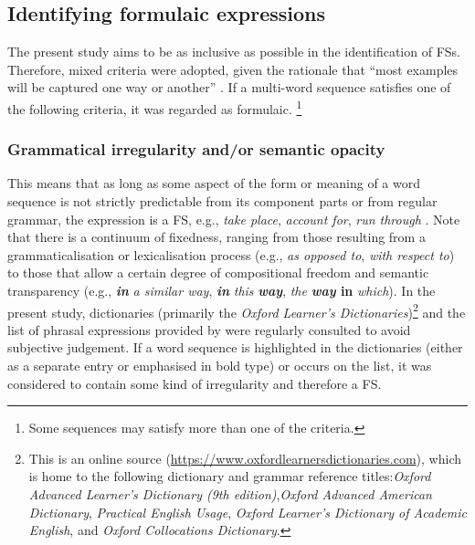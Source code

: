 \documentclass[output=paper]{langscibook}
\begin{document}
\subsection{Identifying formulaic expressions}\label{sec:wang:2.2}

The present study aims to be as inclusive as possible in the identification of FSs. Therefore, mixed criteria were adopted, given the rationale that “most examples will be captured one way or another” \citep[110]{Wray2008}. If a multi-word sequence satisfies one of the following criteria, it was regarded as formulaic. \footnote{{Some sequences may satisfy more than one of the criteria.}}

\subsubsection{Grammatical irregularity and/or semantic opacity}

This means that as long as some aspect of the form or meaning of a word sequence is not strictly predictable from its component parts or from regular grammar, the expression is a FS, e.g., \textit{take place}, \textit{account for}, \textit{run through} \citep{Wray2008,SchneiderEtAl2014,Herbst2015}. Note that there is a continuum of fixedness, ranging from those resulting from a grammaticalisation or lexicalisation process (e.g., \textit{as opposed to}, \textit{with respect to}) to those that allow a certain degree of compositional freedom and semantic transparency (e.g., \textbf{\textit{in}} \textit{a similar way}, \textbf{\textit{in}} \textit{this} \textbf{\textit{way}}, \textit{the} \textbf{\textit{way} \textbf{in}} \textit{which}). In the present study, dictionaries (primarily the \textit{Oxford Learner's Dictionaries})\footnote{{This is an online source (}\url{https://www.oxfordlearnersdictionaries.com}\textrm{), which is home to the following dictionary and grammar reference titles:}{\textit{Oxford Advanced Learner’s Dictionary (9th edition)}},{\textit{Oxford Advanced American Dictionary}}, {\textit{Practical English Usage}}, {\textit{Oxford Learner’s Dictionary of Academic English}}\textrm{, and} {\textit{Oxford Collocations Dictionary}}.} and the list of phrasal expressions provided by \citet{MartinezSchmitt2012} were regularly consulted to avoid subjective judgement. If a word sequence is highlighted in the dictionaries (either as a separate entry or emphasised in bold type) or occurs on the list, it was considered to contain some kind of irregularity and therefore a FS.
\end{document}
